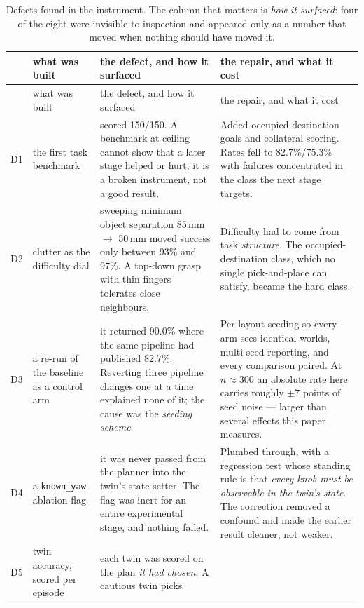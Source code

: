 \documentclass[11pt,a4paper]{article}
\newcommand{\defect}[1]{\textsc{#1}}
\begin{document}
{\small
\begin{longtable}{@{}p{0.45cm}p{3.1cm}p{4.3cm}p{4.6cm}@{}}
\caption{Defects found in the instrument. The column that matters is
\emph{how it surfaced}: four of the eight were invisible to inspection and
appeared only as a number that moved when nothing should have moved it.}
\label{tab:defects}\\
\toprule
 & what was built & the defect, and how it surfaced & the repair, and what it cost \\
\midrule
\endfirsthead
\toprule
 & what was built & the defect, and how it surfaced & the repair, and what it cost \\
\midrule
\endhead
\defect{D1} & the first task benchmark
 & scored 150/150. A benchmark at ceiling cannot show that a later stage helped
   or hurt; it is a broken instrument, not a good result.
 & Added occupied-destination goals and collateral scoring. Rates fell to
   82.7\%/75.3\% with failures concentrated in the class the next stage targets. \\
\addlinespace
\defect{D2} & clutter as the difficulty dial
 & sweeping minimum object separation 85\,mm $\to$ 50\,mm moved success only
   between 93\% and 97\%. A top-down grasp with thin fingers tolerates close
   neighbours.
 & Difficulty had to come from task \emph{structure}. The occupied-destination
   class, which no single pick-and-place can satisfy, became the hard class. \\
\addlinespace
\defect{D3} & a re-run of the baseline as a control arm
 & it returned 90.0\% where the same pipeline had published 82.7\%. Reverting
   three pipeline changes one at a time explained none of it; the cause was the
   \emph{seeding scheme}.
 & Per-layout seeding so every arm sees identical worlds, multi-seed reporting,
   and every comparison paired. At $n\approx300$ an absolute rate here carries
   roughly $\pm7$ points of seed noise --- larger than several effects this
   paper measures. \\
\addlinespace
\defect{D4} & a \texttt{known\_yaw} ablation flag
 & it was never passed from the planner into the twin's state setter. The flag
   was inert for an entire experimental stage, and nothing failed.
 & Plumbed through, with a regression test whose standing rule is that
   \emph{every knob must be observable in the twin's state}. The correction
   removed a confound and made the earlier result cleaner, not weaker. \\
\addlinespace
\defect{D5} & twin accuracy, scored per episode
 & each twin was scored on the plan \emph{it had chosen}. A cautious twin picks

\end{longtable}}
\end{document}
